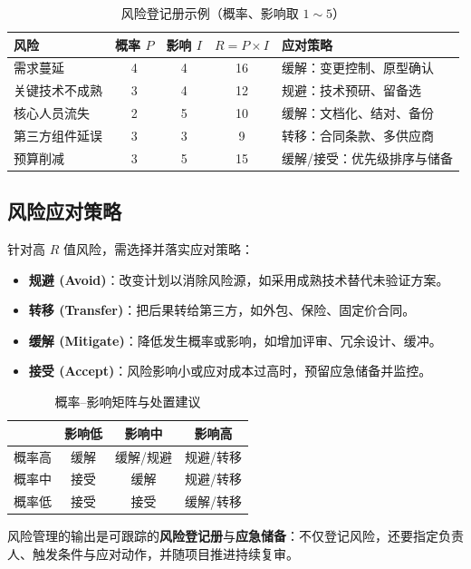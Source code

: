 \begin{table}[H]
\centering
\caption{风险登记册示例（概率、影响取 $1\sim5$）}
\begin{tabulary}{\textwidth}{LCCCL}
\toprule
风险 & 概率 $P$ & 影响 $I$ & $R=P\times I$ & 应对策略 \\
\midrule
需求蔓延 & 4 & 4 & 16 & 缓解：变更控制、原型确认 \\
关键技术不成熟 & 3 & 4 & 12 & 规避：技术预研、留备选 \\
核心人员流失 & 2 & 5 & 10 & 缓解：文档化、结对、备份 \\
第三方组件延误 & 3 & 3 & 9 & 转移：合同条款、多供应商 \\
预算削减 & 3 & 5 & 15 & 缓解/接受：优先级排序与储备 \\
\bottomrule
\end{tabulary}
\end{table}

\subsection{风险应对策略}

针对高 $R$ 值风险，需选择并落实应对策略：

\begin{itemize}
    \item \textbf{规避 (Avoid)}：改变计划以消除风险源，如采用成熟技术替代未验证方案。
    \item \textbf{转移 (Transfer)}：把后果转给第三方，如外包、保险、固定价合同。
    \item \textbf{缓解 (Mitigate)}：降低发生概率或影响，如增加评审、冗余设计、缓冲。
    \item \textbf{接受 (Accept)}：风险影响小或应对成本过高时，预留应急储备并监控。
\end{itemize}

\begin{table}[H]
\centering
\caption{概率--影响矩阵与处置建议}
\begin{tabulary}{\textwidth}{CCCC}
\toprule
 & 影响低 & 影响中 & 影响高 \\
\midrule
概率高 & 缓解 & 缓解/规避 & 规避/转移 \\
概率中 & 接受 & 缓解 & 规避/转移 \\
概率低 & 接受 & 接受 & 缓解/转移 \\
\bottomrule
\end{tabulary}
\end{table}

\noindent 风险管理的输出是可跟踪的\textbf{风险登记册}与\textbf{应急储备}：不仅登记风险，还要指定负责人、触发条件与应对动作，并随项目推进持续复审。

